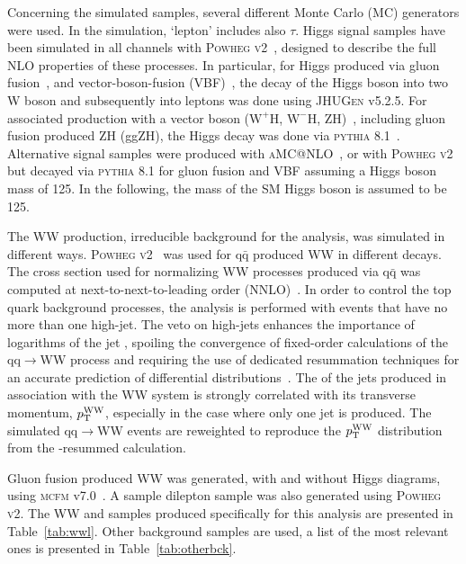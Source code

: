 Concerning the simulated samples, several different Monte Carlo (MC) generators were used. 
In the simulation, `lepton' includes also $\tau$.
Higgs signal samples have been simulated in all channels with
\textsc{Powheg v2}~\cite{Nason:2004rx,Frixione:2007vw,Alioli:2010xd}, designed to describe the full NLO properties of these processes.
In particular, for Higgs produced via gluon fusion~\cite{Alioli:2008tz}, and vector-boson-fusion (VBF)~\cite{Nason:2009ai},
the decay of the Higgs boson into two W boson and subsequently into leptons was done using \textsc{JHUGen} v5.2.5. 
For associated production with a vector boson ($\mathrm{W}^{+}\mathrm{H}$, $\mathrm{W}^{-}\mathrm{H}$, ZH)~\cite{Luisoni:2013kna}, including gluon fusion produced ZH (ggZH), 
the Higgs decay was done via \textsc{pythia} 8.1~\cite{Sjostrand:2007gs}.  Alternative signal samples were produced with \textsc{aMC@NLO}~\cite{Alwall:2014hca}, or  with \textsc{Powheg v2} but decayed via \textsc{pythia} 8.1 for gluon fusion and VBF assuming 
a Higgs boson mass of 125\GeV. In the following, the mass of the SM Higgs boson is assumed to be 125\GeV.

The WW production, irreducible background for the analysis, was simulated in different ways. 
\textsc{Powheg v2}~\cite{Melia:2011tj} was used for $\mathrm{q\bar q}$ produced WW in different decays. 
The cross section used for normalizing WW processes produced via $\mathrm{q\bar q}$ was computed at next-to-next-to-leading order (NNLO)~\cite{Gehrmann:2014fva}. 
In order to control the top quark background processes, the analysis is performed with events that have no more than one 
high-\pt jet. The veto on high-\pt jets enhances the importance of logarithms of the jet \pt, spoiling the convergence of 
fixed-order calculations of the qq$\rightarrow$WW process and requiring the use of dedicated resummation techniques for an
accurate prediction of differential distributions~\cite{Meade:2014fca,Jaiswal:2014yba}. 
The \pt of the jets produced in association with the WW system is strongly correlated with its transverse momentum, 
$p_\mathrm{T}^\mathrm{WW}$, especially in the case where only one jet is produced. The simulated qq$\rightarrow$WW events are reweighted  
to reproduce the $p_\mathrm{T}^\mathrm{WW}$ distribution from the \pt-resummed calculation.

Gluon fusion produced WW was generated, with and without Higgs diagrams, using \textsc{mcfm} v7.0~\cite{Campbell:2013wga}. 
A \ttbar sample dilepton sample was also generated using \textsc{Powheg v2}. The WW and \ttbar samples 
produced specifically for this analysis are presented in Table~\ref{tab:wwl}. Other background samples are used, a list of the most relevant ones is presented in Table~\ref{tab:otherbck}.

